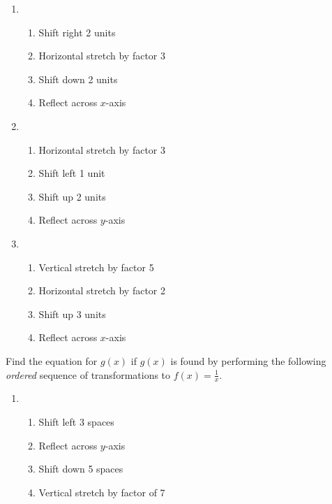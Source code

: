 \begin{enumerate}	\setcounter{enumi}{\value{Review}}
\item \begin{enumerate}[(1)]
\setlength\itemsep{0pt}
    \item Shift right 2 units
    \item Horizontal stretch by factor 3
    \item Shift down 2 units
    \item Reflect across $x$-axis
\end{enumerate}

\item
\begin{enumerate}[(1)]
\setlength\itemsep{0pt}
    \item Horizontal stretch by factor 3
    \item Shift left 1 unit
    \item Shift up 2 units
    \item Reflect across $y$-axis
\end{enumerate}

\item
\begin{enumerate}[(1)]
\setlength\itemsep{0pt}
    \item Vertical stretch by factor 5
    \item Horizontal stretch by factor 2
    \item Shift up 3 units
    \item Reflect across $x$-axis
\end{enumerate}
\setcounter{Review}{\value{enumi}}
\end{enumerate}

Find the equation for $g(x)$ if $g(x)$ is found by performing the following \emph{ordered} sequence of transformations to $f(x)=\frac{1}{x}$.

\begin{enumerate}	\setcounter{enumi}{\value{Review}}
\item \begin{enumerate}[(1)]
\setlength\itemsep{0pt}
	\item Shift left 3 spaces
	\item Reflect across $y$-axis
	\item Shift down 5 spaces
	\item Vertical stretch by factor of 7
\end{enumerate}
\setcounter{Review}{\value{enumi}}
\end{enumerate}

